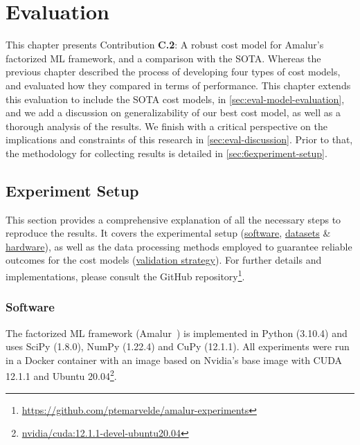 
\chapter{Evaluation}
\label{chapter:evaluation-discussion}
This chapter presents Contribution \textbf{C.2}: A robust cost model for Amalur's factorized ML framework, and a comparison with the SOTA.
Whereas the previous chapter described the process of developing four types of cost models, and evaluated how they compared in terms of performance. This chapter extends this evaluation to include the SOTA cost models, in \autoref{sec:eval-model-evaluation}, and we add a discussion on generalizability of our best cost model, as well as a thorough analysis of the results. We finish with a critical perspective on the implications and constraints of this research in \autoref{sec:eval-discussion}. Prior to that, the methodology for collecting results is detailed in \autoref{sec:6experiment-setup}.

\section{Experiment Setup}
\label{sec:6experiment-setup}
This section provides a comprehensive explanation of all the necessary steps to reproduce the results. It covers the experimental setup (\hyperref[subsec:6-software]{software}, \hyperref[subsec:6-datasets]{datasets} \& \hyperref[subsec:6-hardware]{hardware}), as well as the data processing methods employed to guarantee reliable outcomes for the cost models (\hyperref[subsec:6-validation-strategy]{validation strategy}). For further details and implementations, please consult the GitHub repository\footnote{\url{https://github.com/ptemarvelde/amalur-experiments}}.

\subsection{Software}
\label{subsec:6-software}
The factorized ML framework (Amalur~\cite{amalur}) is implemented in Python (3.10.4) and uses SciPy (1.8.0), NumPy (1.22.4) and CuPy (12.1.1). All experiments were run in a Docker container with an image based on Nvidia's base image with CUDA 12.1.1 and Ubuntu 20.04\footnote{\href{https://hub.docker.com/layers/nvidia/cuda/12.1.1-devel-ubuntu20.04/images/sha256-5bd13c67a4479a1c13238b470d89a92937ce68ba5f21b930d50c463e3314f657?context=explore}{nvidia/cuda:12.1.1-devel-ubuntu20.04}}.

